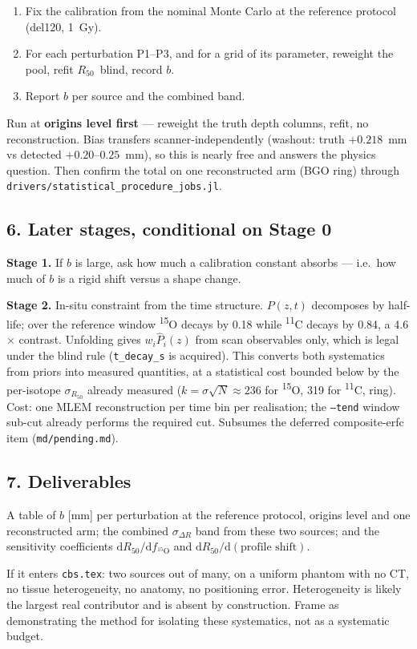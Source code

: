 \documentclass[11pt]{article}
\newcommand{\iso}[2]{\textsuperscript{#1}#2}
\newcommand{\Rc}{\ensuremath{R_{50}}}
\begin{document}
\begin{enumerate}
  \item Fix the calibration from the nominal Monte Carlo at the reference
    protocol (del120, 1~Gy).
  \item For each perturbation P1--P3, and for a grid of its parameter, reweight
    the pool, refit \Rc\ blind, record $b$.
  \item Report $b$ per source and the combined band.
\end{enumerate}

Run at \textbf{origins level first} --- reweight the truth depth columns, refit,
no reconstruction. Bias transfers scanner-independently (washout: truth
$+0.218$~mm vs detected $+0.20$--$0.25$~mm), so this is nearly free and answers
the physics question. Then confirm the total on one reconstructed arm (BGO ring)
through \texttt{drivers/statistical\_procedure\_jobs.jl}.

\subsection*{6. Later stages, conditional on Stage 0}

\noindent
\textbf{Stage 1.} If $b$ is large, ask how much a calibration constant absorbs
--- i.e.\ how much of $b$ is a rigid shift versus a shape change.

\noindent
\textbf{Stage 2.} In-situ constraint from the time structure. $P(z,t)$
decomposes by half-life; over the reference window \iso{15}{O} decays by 0.18
while \iso{11}{C} decays by 0.84, a 4.6$\times$ contrast. Unfolding gives
$w_i \hat P_i(z)$ from scan observables only, which is legal under the blind
rule (\texttt{t\_decay\_s} is acquired). This converts both systematics from
priors into measured quantities, at a statistical cost bounded below by the
per-isotope $\sigma_{\Rc}$ already measured
($k = \sigma\sqrt{N} \approx 236$ for \iso{15}{O}, 319 for \iso{11}{C}, ring).
Cost: one MLEM reconstruction per time bin per realisation; the
\texttt{--tend} window sub-cut already performs the required cut. Subsumes the
deferred composite-erfc item (\texttt{md/pending.md}).

\subsection*{7. Deliverables}

A table of $b$ [mm] per perturbation at the reference protocol, origins level
and one reconstructed arm; the combined $\sigma_{\Delta R}$ band from these two
sources; and the sensitivity coefficients
$\mathrm{d}\Rc/\mathrm{d}f_{^{15}\mathrm{O}}$ and $\mathrm{d}\Rc/\mathrm{d}(\text{profile shift})$.

If it enters \texttt{cbs.tex}: two sources out of many, on a uniform phantom
with no CT, no tissue heterogeneity, no anatomy, no positioning error.
Heterogeneity is likely the largest real contributor and is absent by
construction. Frame as demonstrating the method for isolating these
systematics, not as a systematic budget.
\end{document}
